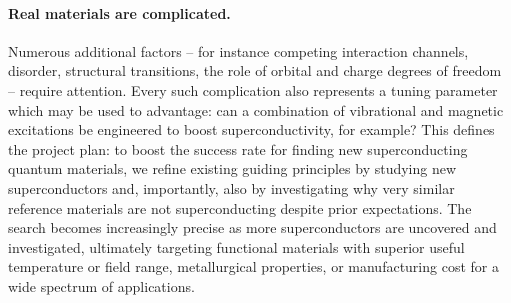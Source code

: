 

\paragraph{Real materials are complicated.} Numerous additional factors -- for instance competing interaction channels, disorder, structural transitions, the role of orbital and charge degrees of freedom -- require attention. Every such complication also represents a tuning parameter which may be used to advantage: can a combination of vibrational and magnetic excitations be engineered to boost superconductivity, for example? This defines the project plan: to boost the success rate for finding new superconducting quantum materials, we refine existing guiding principles by studying new superconductors and, importantly, also by investigating why very similar reference materials are not superconducting despite prior expectations. The search becomes increasingly precise as more superconductors are uncovered and investigated, ultimately targeting functional materials with superior useful temperature or field range, metallurgical properties, or manufacturing cost for a wide spectrum of applications.





